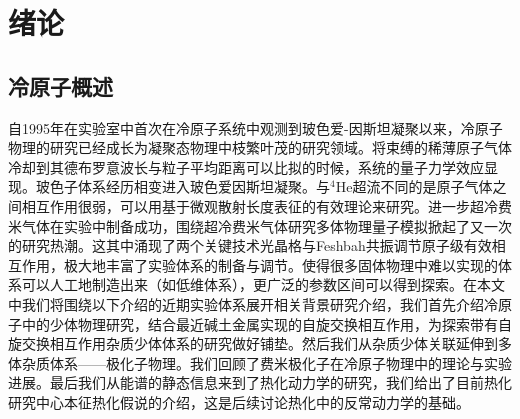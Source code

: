 \chapter{绪论}\label{chap:kondo}



\section{冷原子概述}

自1995年在实验室中首次在冷原子系统中观测到玻色爱-因斯坦凝聚\cite{anderson1995observation,davis1995bose,Bradley1995evidence}以来，冷原子物理的研究已经成长为凝聚态物理中枝繁叶茂的研究领域。将束缚的稀薄原子气体冷却到其德布罗意波长与粒子平均距离可以比拟的时候，系统的量子力学效应显现。玻色子体系经历相变进入玻色爱因斯坦凝聚。与${}^4$He超流不同的是原子气体之间相互作用很弱，可以用基于微观散射长度表征的有效理论来研究\cite{Dalfovo1999theory,Fetter2009rotating,pethick2008bose,pitaevskii2003bose}。进一步超冷费米气体在实验中制备成功，围绕超冷费米气体研究多体物理量子模拟掀起了又一次的研究热潮\cite{Giorgini2008theory}。这其中涌现了两个关键技术光晶格\cite{Bloch2008many}与Feshbah共振调节原子级有效相互作用\cite{Chin2010feshbach}，极大地丰富了实验体系的制备与调节。使得很多固体物理中难以实现的体系可以人工地制造出来（如低维体系\cite{Cazalilla2011one,Guan2013fermi}），更广泛的参数区间可以得到探索。在本文中我们将围绕以下介绍的近期实验体系展开相关背景研究介绍，我们首先介绍冷原子中的少体物理研究，结合最近碱土金属实现的自旋交换相互作用，为探索带有自旋交换相互作用杂质少体体系的研究做好铺垫。然后我们从杂质少体关联延伸到多体杂质体系——极化子物理。我们回顾了费米极化子在冷原子物理中的理论与实验进展。最后我们从能谱的静态信息来到了热化动力学的研究，我们给出了目前热化研究中心本征热化假说的介绍，这是后续讨论热化中的反常动力学的基础。





